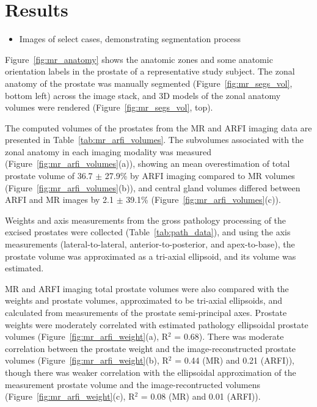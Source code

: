 \section{Results}\label{sect:results}

\begin{itemize}
    \item Images of select cases, demonstrating segmentation process
\end{itemize}

Figure~\ref{fig:mr_anatomy} shows the anatomic zones and some anatomic
orientation labels in the prostate of a representative study subject.  The
zonal anatomy of the prostate was manually segmented
(Figure~\ref{fig:mr_segs_vol}, bottom left) across the image stack, and 3D
models of the zonal anatomy volumes were rendered
(Figure~\ref{fig:mr_segs_vol}, top).





The computed volumes of the prostates from the MR and ARFI imaging data are
presented in Table~\ref{tab:mr_arfi_volumes}.  The subvolumes associated with
the zonal anatomy in each imaging modality was measured
(Figure~\ref{fig:mr_arfi_volumes}(a)), showing an mean overestimation of total
prostate volume of 36.7 $\pm$ 27.9\% by ARFI imaging compared to MR volumes
(Figure~\ref{fig:mr_arfi_volumes}(b)), and central gland volumes differed
between ARFI and MR images by 2.1 $\pm$ 39.1\%
(Figure~\ref{fig:mr_arfi_volumes}(c)).




Weights and axis measurements from the gross pathology processing of the
excised prostates were collected (Table~\ref{tab:path_data}), and using the
axis measurements (lateral-to-lateral, anterior-to-posterior, and
apex-to-base), the prostate volume was approximated as a tri-axial ellipsoid,
and its volume was estimated.

MR and ARFI imaging total prostate volumes were also compared with the weights
and prostate volumes, approximated to be tri-axial ellipsoids, and calculated
from measurements of the prostate semi-principal axes.  Prostate weights were
moderately correlated with estimated pathology ellipsoidal prostate volumes
(Figure~\ref{fig:mr_arfi_weight}(a), R$^2$ = 0.68).  There was moderate
correlation between the prostate weight and the image-reconstructed prostate
volumes (Figure~\ref{fig:mr_arfi_weight}(b), R$^2$ = 0.44 (MR) and 0.21
(ARFI)), though there was weaker correlation with the ellipsoidal approximation
of the measurement prostate volume and the image-recontructed volumens
(Figure~\ref{fig:mr_arfi_weight}(c), R$^2$ = 0.08 (MR) and 0.01 (ARFI)).  

